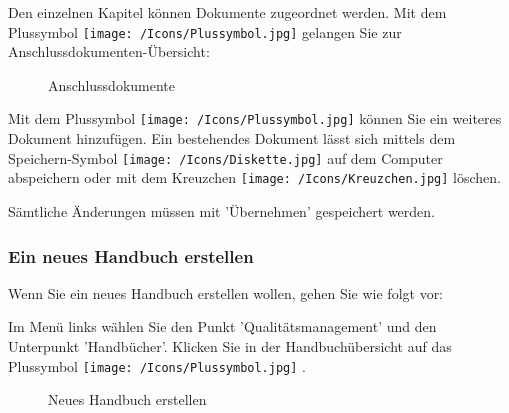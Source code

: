 Den einzelnen Kapitel können Dokumente zugeordnet werden. Mit dem Plussymbol \texttt{[image: /Icons/Plussymbol.jpg]}  gelangen Sie zur Anschlussdokumenten-Übersicht:

\begin{figure}[H]
\caption{Anschlussdokumente}
\end{figure}

Mit dem Plussymbol \texttt{[image: /Icons/Plussymbol.jpg]}  können Sie ein weiteres Dokument hinzufügen. Ein bestehendes Dokument lässt sich mittels dem Speichern-Symbol \texttt{[image: /Icons/Diskette.jpg]}  auf dem Computer abspeichern oder mit dem Kreuzchen \texttt{[image: /Icons/Kreuzchen.jpg]}  löschen.

Sämtliche Änderungen müssen mit 'Übernehmen'  gespeichert werden. 

\subsubsection{Ein neues Handbuch erstellen}
\label{bkm:Ref930000788}

Wenn Sie ein neues Handbuch erstellen wollen, gehen Sie wie folgt vor:

Im Menü links wählen Sie den Punkt 'Qualitätsmanagement' und den Unterpunkt 'Handbücher'. Klicken Sie in der Handbuchübersicht auf das Plussymbol \texttt{[image: /Icons/Plussymbol.jpg]} .

\begin{figure}[H]
\caption{Neues Handbuch erstellen}
\end{figure}

